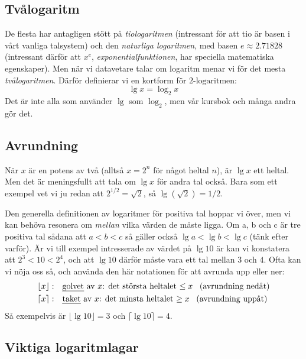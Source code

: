 \documentclass[a4paper]{article}
\begin{document}
\subsection*{Tvålogaritm}
\label{sec:orgaa845a5}

   De flesta har antagligen stött på \emph{tiologaritmen} (intressant för att tio är
basen i vårt vanliga talsystem) och den \emph{naturliga logaritmen}, med
basen \(e \approx 2.71828\) (intressant därför att \(x^e\), \emph{exponentialfunktionen},
har speciella matematiska egenskaper). Men när vi datavetare talar om logaritm
menar vi för det mesta \emph{tvålogaritmen}. Därför definierar vi en kortform för \(2\text{-logaritmen}\):
\[\lg x = \log_2 x\]
Det är inte alla som använder \(\lg\) som \(\log_2\), men vår kursbok och många
andra gör det.

\subsection*{Avrundning}
\label{sec:org57038d2}

När \(x\) är en potens av två (alltså \(x = 2^n\) för något heltal \(n\)),
är \(\lg x\) ett heltal. Men det är meningsfullt att tala om \(\lg x\) för andra tal
också. Bara som ett exempel vet vi ju redan att \(2^{1/2} =
\sqrt{2}\), så \(\lg (\sqrt{2})
= 1/2\).

Den generella definitionen av logaritmer för positiva tal hoppar vi över,
men vi kan behöva resonera om \emph{mellan} vilka värden de måste ligga. Om a, b och
c är tre positiva tal sådana att \(a < b < c\) så gäller också \(\lg a < \lg b
< \lg c\) (tänk efter varför). Är vi till exempel intresserade av värdet på \(\lg 10\) är kan vi
konstatera att \(2^3 < 10 < 2^4\), och att \(\lg 10\) därför måste vara ett tal
mellan \(3\) och \(4\). Ofta kan vi nöja oss så, och använda den här
notationen för att avrunda upp eller ner:
\begin{align*}
\lfloor x \rfloor: & \quad \text{\emph{golvet} av $x$: det största heltalet $ \le x$ \enskip (avrundning nedåt)} \\
\lceil x \rceil: & \quad \text{\emph{taket} av $x$: det minsta heltalet $ \ge x$ \enskip (avrundning uppåt)}
\end{align*}
Så exempelvis är \(\lfloor \lg 10 \rfloor = 3\) och \(\lceil \lg 10 \rceil = 4\).

\subsection*{Viktiga logaritmlagar}
\label{sec:org2959031}
\end{document}
